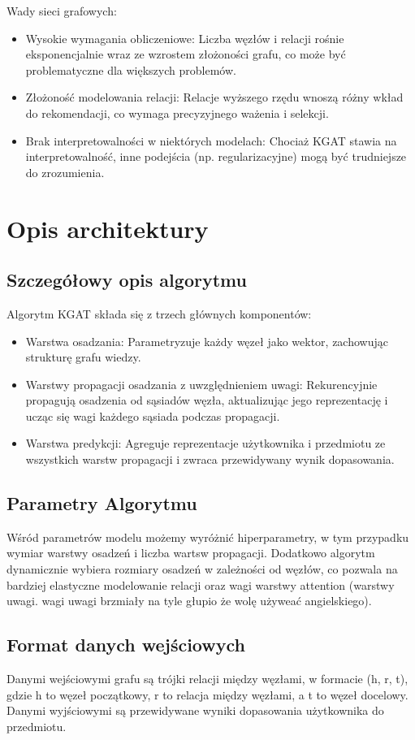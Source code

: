 \documentclass[a4paper]{LTJournalArticle}
\begin{document}
Wady sieci grafowych:
\begin{itemize}
	\item Wysokie wymagania obliczeniowe: Liczba węzłów i relacji rośnie eksponencjalnie wraz ze wzrostem złożoności grafu, co może być problematyczne dla większych problemów.
	\item Złożoność modelowania relacji: Relacje wyższego rzędu wnoszą różny wkład do rekomendacji, co wymaga precyzyjnego ważenia i selekcji.
	\item Brak interpretowalności w niektórych modelach: Chociaż KGAT stawia na interpretowalność, inne podejścia (np. regularizacyjne) mogą być trudniejsze do zrozumienia.
\end{itemize}
\section{Opis architektury}
\subsection{Szczegółowy opis algorytmu}
	
Algorytm KGAT składa się z trzech głównych komponentów:
\begin{itemize}
	\item Warstwa osadzania: Parametryzuje każdy węzeł jako wektor, zachowując strukturę grafu wiedzy.
	\item Warstwy propagacji osadzania z uwzględnieniem uwagi: Rekurencyjnie propagują osadzenia od sąsiadów węzła, aktualizując jego reprezentację i ucząc się wagi każdego sąsiada podczas propagacji.
	\item Warstwa predykcji: Agreguje reprezentacje użytkownika i przedmiotu ze wszystkich warstw propagacji i zwraca przewidywany wynik dopasowania.
\end{itemize}
\subsection{Parametry Algorytmu}
Wśród parametrów modelu możemy wyróżnić hiperparametry, w tym przypadku wymiar warstwy osadzeń i liczba wartsw propagacji. Dodatkowo algorytm dynamicznie wybiera rozmiary
osadzeń w zależności od węzłów, co pozwala na bardziej elastyczne modelowanie relacji oraz wagi warstwy attention (warstwy uwagi. wagi uwagi brzmiały na tyle głupio że wolę używeać angielskiego).
\subsection{Format danych wejściowych}
Danymi wejściowymi grafu są trójki relacji między węzłami, w formacie (h, r, t), gdzie h to węzeł początkowy, r to relacja między węzłami, a t to węzeł docelowy.\\
Danymi wyjściowymi są przewidywane wyniki dopasowania użytkownika do przedmiotu.
\end{document}
